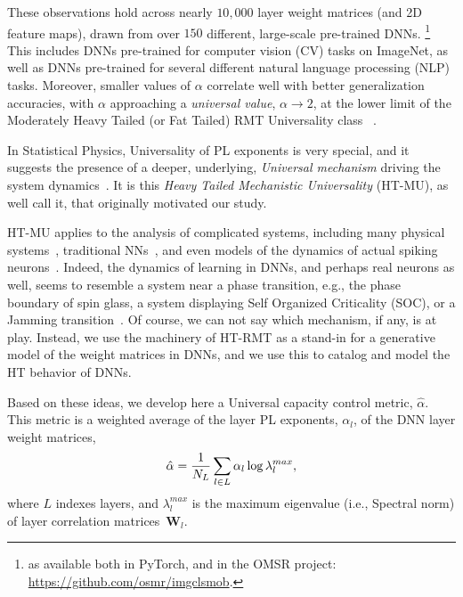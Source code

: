 These observations hold across nearly $10,000$ layer weight matrices (and 2D feature maps), drawn from over $150$ different, large-scale pre-trained DNNs.
\footnote{as available both in PyTorch, and in the OMSR project: \url{https://github.com/osmr/imgclsmob}.}
This includes DNNs pre-trained for computer vision (CV) tasks on ImageNet, as well as DNNs pre-trained for several different natural language processing (NLP) tasks.
Moreover, smaller values of $\alpha$ correlate well with better generalization accuracies, with $\alpha$ approaching a \emph{universal value}, $\alpha\rightarrow 2$, at the lower limit of the Moderately Heavy Tailed (or Fat Tailed) RMT Universality class~\cite{MM18_TR,MM19_HTSR_ICML} .  

In Statistical Physics, Universality of PL exponents is very special, and it suggests the presence of a deeper, underlying, \emph{Universal mechanism} driving the system dynamics~\cite{SornetteBook,BouchaudPotters03}.
It is this \emph{Heavy Tailed Mechanistic Universality} (HT-MU), as well call it, that originally motivated our study.  

HT-MU applies to the analysis of complicated systems, including many physical systems~\cite{SornetteBook}, traditional NNs~\cite{EB01_BOOK,nishimori01}, and even models of the dynamics of actual spiking neurons~\cite{FIBX12}.
Indeed, the dynamics of learning in DNNs, and perhaps real neurons as well, seems to resemble a system near a phase transition, e.g., the phase boundary of spin glass, a system displaying Self Organized Criticality (SOC), or a Jamming transition~\cite{GSdx18_TR,SGd18_TR}. 
Of course, we can not say which mechanism, if any, is at play. 
Instead, we use the machinery of  HT-RMT as a stand-in for a generative model of the weight matrices in DNNs, and we use this to catalog and model the HT behavior of DNNs.%

Based on these ideas, we develop here a Universal capacity control metric, $\hat{\alpha}$.
This metric is a weighted average of the layer PL exponents, $\alpha_{l}$, of the DNN layer weight matrices,
\vspace{-2mm}
\begin{equation}
\hat{\alpha}=\dfrac{1}{N_L}\sum_{l\in L}\alpha_{l}\log\lambda_{l}^{max}  ,
\label{eqn:alpha_hat_specific}
\vspace{-1mm}
\end{equation}
where $L$ indexes layers, and 
$\lambda_{l}^{max}$ is the maximum eigenvalue (i.e., Spectral norm) of layer correlation matrices~$\mathbf{W}_{l}$. 

